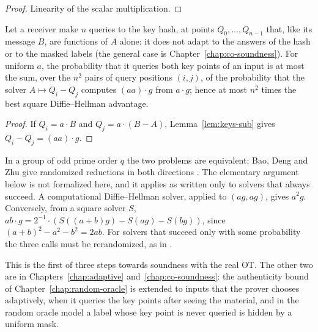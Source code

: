 \begin{proof}
  \leanok
  Linearity of the scalar multiplication.
\end{proof}

\begin{theorem}
  \label{thm:sqdh}
  \leanok
  Let a receiver make $n$ queries to the key hash, at points $Q_0, \dots, Q_{n-1}$ that, like its
  message $B$, are functions of $A$ alone: it does not adapt to the answers of the hash or to the
  masked labels (the general case is Chapter~\ref{chap:co-soundness}). For uniform $a$, the probability that it queries
  both key points of an input is at most the sum, over the $n^2$ pairs of query positions $(i, j)$,
  of the probability that the solver $A \mapsto Q_i - Q_j$ computes $(a a) \cdot g$ from
  $a \cdot g$; hence at most $n^2$ times the best square Diffie--Hellman advantage.
\end{theorem}

\begin{proof}
  \leanok
  If $Q_i = a \cdot B$ and $Q_j = a \cdot (B - A)$, Lemma~\ref{lem:keys-sub} gives
  $Q_i - Q_j = (a a) \cdot g$.
\end{proof}

\begin{remark}
  In a group of odd prime order $q$ the two problems are equivalent; Bao, Deng and Zhu give
  randomized reductions in both directions \cite[Sect.~2.1]{BDZ03}. The elementary argument below is
  not formalized here, and it applies as written only to solvers that always succeed. A
  computational Diffie--Hellman solver, applied to $(a g, a g)$, gives $a^2 g$. Conversely, from a
  square solver $S$, $ab \cdot g = 2^{-1} \cdot (S((a+b)g) - S(ag) - S(bg))$, since
  $(a+b)^2 - a^2 - b^2 = 2ab$. For solvers that succeed only with some probability the three calls
  must be rerandomized, as in \cite[Sect.~2.1]{BDZ03}.
\end{remark}

\begin{remark}
  This is the first of three steps towards soundness with the real OT. The other two are in
  Chapters~\ref{chap:adaptive} and~\ref{chap:co-soundness}: the authenticity bound of
  Chapter~\ref{chap:random-oracle} is extended to inputs that the prover chooses adaptively, when
  it queries the key points after seeing the material, and in the random oracle model a label whose
  key point is never queried is hidden by a uniform mask.
\end{remark}
